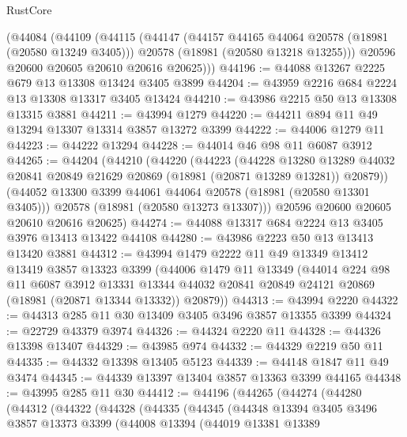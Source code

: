\begin{lexlean}{RustCore}
\begin{coremodule}
    (@44084
      (@44109
        (@44115
          (@44147
            (@44157 @44165 @44064 @20578 (@18981 (@20580 @13249 @3405)))
            @20578
            (@18981 (@20580 @13218 @13255)))
          @20596
          @20600
          @20605
          @20610
          @20616
          @20625)))
@44196 := @44088 @13267 @2225 @679 @13 @13308 @13424 @3405 @3899
@44204 := @43959 @2216 @684 @2224 @13 @13308 @13317 @3405 @13424
@44210 := @43986 @2215 @50 @13 @13308 @13315 @3881
@44211 := @43994 @1279
@44220 := @44211 @894 @11 @49 @13294 @13307 @13314 @3857 @13272 @3399
@44222 := @44006 @1279 @11
@44223 := @44222 @13294
@44228 := @44014 @46 @98 @11 @6087 @3912
@44265 := @44204
    (@44210
      (@44220
        (@44223
          (@44228
            @13280
            @13289
            @44032
            @20841
            @20849
            @21629
            @20869
            (@18981 (@20871 @13289 @13281))
            @20879))
        (@44052 @13300 @3399 @44061 @44064 @20578 (@18981 (@20580 @13301 @3405)))
        @20578
        (@18981 (@20580 @13273 @13307)))
      @20596
      @20600
      @20605
      @20610
      @20616
      @20625)
@44274 := @44088 @13317 @684 @2224 @13 @3405 @3976 @13413 @13422 @44108
@44280 := @43986 @2223 @50 @13 @13413 @13420 @3881
@44312 := @43994
    @1479
    @2222
    @11
    @49
    @13349
    @13412
    @13419
    @3857
    @13323
    @3399
    (@44006
      @1479
      @11
      @13349
      (@44014
        @224
        @98
        @11
        @6087
        @3912
        @13331
        @13344
        @44032
        @20841
        @20849
        @24121
        @20869
        (@18981 (@20871 @13344 @13332))
        @20879))
@44313 := @43994 @2220
@44322 := @44313 @285 @11 @30 @13409 @3405 @3496 @3857 @13355 @3399
@44324 := @22729 @43379 @3974
@44326 := @44324 @2220 @11
@44328 := @44326 @13398 @13407
@44329 := @43985 @974
@44332 := @44329 @2219 @50 @11
@44335 := @44332 @13398 @13405 @5123
@44339 := @44148 @1847 @11 @49 @3474
@44345 := @44339 @13397 @13404 @3857 @13363 @3399 @44165
@44348 := @43995 @285 @11 @30
@44412 := @44196
    (@44265
      (@44274
        (@44280
          (@44312
            (@44322
              (@44328
                (@44335
                  (@44345
                    (@44348
                      @13394
                      @3405
                      @3496
                      @3857
                      @13373
                      @3399
                      (@44008
                        @13394
                        (@44019
                          @13381
                          @13389

\end{coremodule}
\end{lexlean}
